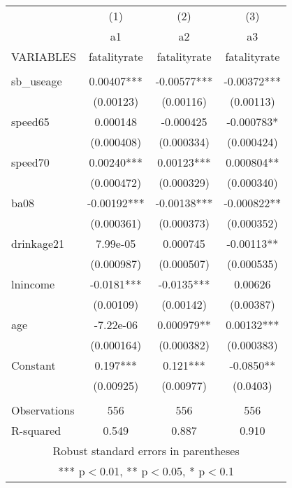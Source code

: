 \documentclass[]{article}
\begin{document}
\begin{tabular}{lccc} \hline
 & (1) & (2) & (3) \\
 & a1 & a2 & a3 \\
VARIABLES & fatalityrate & fatalityrate & fatalityrate \\ \hline
 &  &  &  \\
sb\_useage & 0.00407*** & -0.00577*** & -0.00372*** \\
 & (0.00123) & (0.00116) & (0.00113) \\
speed65 & 0.000148 & -0.000425 & -0.000783* \\
 & (0.000408) & (0.000334) & (0.000424) \\
speed70 & 0.00240*** & 0.00123*** & 0.000804** \\
 & (0.000472) & (0.000329) & (0.000340) \\
ba08 & -0.00192*** & -0.00138*** & -0.000822** \\
 & (0.000361) & (0.000373) & (0.000352) \\
drinkage21 & 7.99e-05 & 0.000745 & -0.00113** \\
 & (0.000987) & (0.000507) & (0.000535) \\
lnincome & -0.0181*** & -0.0135*** & 0.00626 \\
 & (0.00109) & (0.00142) & (0.00387) \\
age & -7.22e-06 & 0.000979** & 0.00132*** \\
 & (0.000164) & (0.000382) & (0.000383) \\
Constant & 0.197*** & 0.121*** & -0.0850** \\
 & (0.00925) & (0.00977) & (0.0403) \\
 &  &  &  \\
Observations & 556 & 556 & 556 \\
 R-squared & 0.549 & 0.887 & 0.910 \\ \hline
\multicolumn{4}{c}{ Robust standard errors in parentheses} \\
\multicolumn{4}{c}{ *** p$<$0.01, ** p$<$0.05, * p$<$0.1} \\
\end{tabular}
\end{document}
